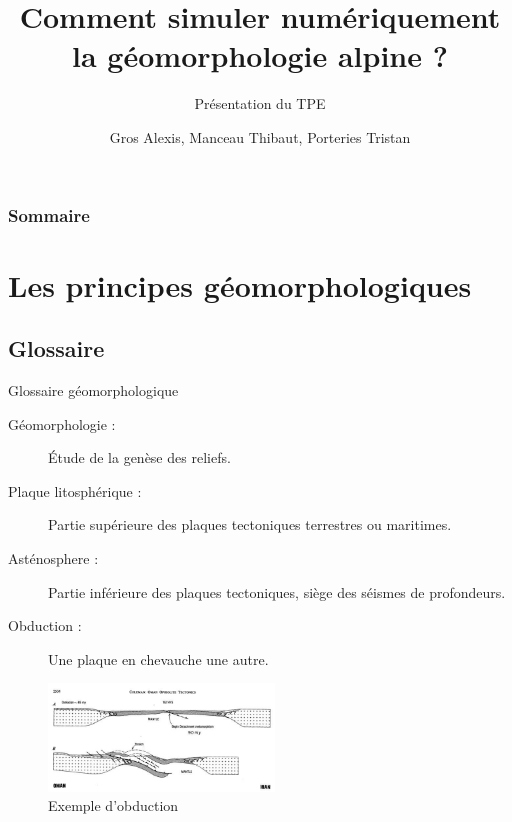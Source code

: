 \documentclass{beamer}
\title{Comment simuler numériquement la géomorphologie alpine ?}
\subtitle{Présentation du TPE}
\author{Gros Alexis, Manceau Thibaut, Porteries Tristan}
\begin{document}
\frame{\titlepage}

\begin{frame}
    \frametitle{Sommaire}
    \begin{multicols}{2}
      {\small
				\setcounter{tocdepth}{1}
        \tableofcontents
      }
    \end{multicols}
\end{frame}

\section{Les principes géomorphologiques}

\subsection{Glossaire}
\begin{frame}{Glossaire géomorphologique}
  \begin{description}
    \item[Géomorphologie :] Étude de la genèse des reliefs.
    \item[Plaque litosphérique :] Partie supérieure des plaques tectoniques terrestres ou maritimes.
    \item[Asténosphere :] Partie inférieure des plaques tectoniques, siège des séismes de profondeurs.
    \item[Obduction :] Une plaque en chevauche une autre.
  \end{description}
  \begin{center}
    \begin{figure}
      \includegraphics[width=6cm]{Images/Images_Alexis/image007.jpg}
      \caption{Exemple d'obduction}
    \end{figure}
  \end{center}
\end{frame}
\end{document}
